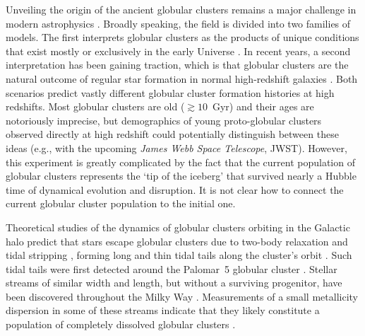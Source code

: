 \documentclass[twocolumn]{aastex63}
\begin{document}
Unveiling the origin of the ancient globular clusters remains a major challenge in modern astrophysics \citep[e.g.][]{brodie:2006,kruijssen:2014,forbes:2018,adamo:2020}.
Broadly speaking, the field is divided into two families of models.
The first interprets globular clusters as the products of unique conditions that exist mostly or exclusively in the early Universe \citep[e.g.][]{peebles:1968,fall:1985,ashman:1992,trenti:2015,madau:2020}.
In recent years, a second interpretation has been gaining traction, which is that globular clusters are the natural outcome of regular star formation in normal high-redshift galaxies \citep[e.g.][]{kravtsov:2005,kruijssen15b,pfeffer:2018,keller:2020}.
Both scenarios predict vastly different globular cluster formation histories at high redshifts.
Most globular clusters are old ($\gtrsim10$~Gyr) and their ages are notoriously imprecise, but demographics of young proto-globular clusters observed directly at high redshift could potentially distinguish between these ideas (e.g., with the upcoming \textit{James Webb Space Telescope}, JWST).
However, this experiment is greatly complicated by the fact that the current population of globular clusters represents the `tip of the iceberg' that survived nearly a Hubble time of dynamical evolution and disruption.
It is not clear how to connect the current globular cluster population to the initial one.

Theoretical studies of the dynamics of globular clusters orbiting in the Galactic halo predict that stars escape globular clusters due to two-body relaxation and tidal stripping \citep[often referred to as `evaporation', e.g.,][]{spitzer:1987, baumgardt03}, forming long and thin tidal tails along the cluster's orbit \citep{combes:1999}.
Such tidal tails were first detected around the Palomar~5 globular cluster \citep{odenkirchen:2001, rockosi:2002}.
Stellar streams of similar width and length, but without a surviving progenitor, have been discovered throughout the Milky Way \citep[e.g.,][]{gd:2006, grillmair:2009, bonaca:2012, shipp:2018, ibata:2019}.
Measurements of a small metallicity dispersion in some of these streams indicate that they likely constitute a population of completely dissolved globular clusters \citep{bonaca:2020b, hansen:2020, ji:2020}.
\end{document}
